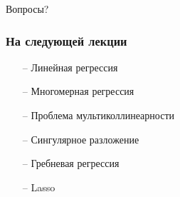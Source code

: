 \documentclass[10pt]{beamer}
\begin{document}
\begin{frame}[standout]
  Вопросы?
\end{frame}

\appendix

\begin{frame}\frametitle{На следующей лекции}
	\begin{itemize}
    	\item[--] Линейная регрессия
    \item[--] Многомерная регрессия
    \item[--] Проблема мультиколлинеарности
    \item[--] Сингулярное разложение
    \item[--] Гребневая регрессия
    \item[--] Lasso
	\end{itemize}
\end{frame}
\end{document}
